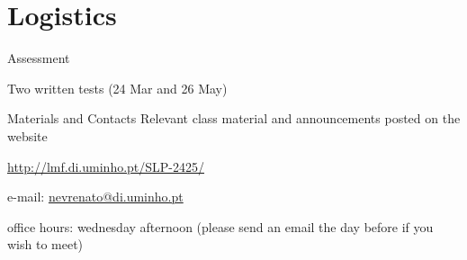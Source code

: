 \documentclass{beamer}
\begin{document}
\section{Logistics}

\begin{frame}{Assessment}

  Two written tests (24 Mar and 26 May)

\end{frame}

\begin{frame}{Materials and Contacts}
  Relevant class material and announcements posted on the website

  \url{http://lmf.di.uminho.pt/SLP-2425/}

  e-mail: \href{mailto:nevrenato@di.uminho.pt}{nevrenato@di.uminho.pt}

  office hours: wednesday afternoon (please send an email the day before if you wish to meet)
\end{frame}

\nocite{winskel93,nielson07,crole03}


\end{document}
